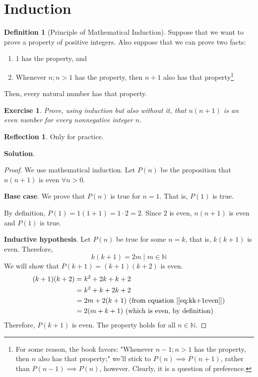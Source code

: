 \documentclass[11pt]{book}
\theoremstyle{definition}
\newtheorem{definition}{Definition}
\theoremstyle{plain}
\newtheorem{exercise}{Exercise}
\theoremstyle{definition}
\theoremstyle{problemstyle}
\theoremstyle{remark}
\theoremstyle{definition}
\newtheorem{reflection}{Reflection}
\begin{document}
\section{Induction}
\begin{definition}[Principle of Mathematical Induction]
    Suppose that we want to prove a property of positive integers. Also suppose that we can prove two facts:
    \begin{enumerate}[label=\alph*)]
        \item $1$ has the property, and
        \item Whenever $n; n>1$ has the property, then $n+1$ also has that property\footnote{For some reason, the book favors: "Whenever $n-1; n>1$ has the property, then $n$ also has that property;" we'll stick to $P(n)\implies P(n+1)$, rather than $P(n-1)\implies P(n)$, however. Clearly, it is a question of preference.}
    \end{enumerate}
    Then, every natural number has that property.
\end{definition}
\begin{exercise}
    \label{ex:2.1.1}
    Prove, using induction but also without it, that $n(n+1)$ is an even number for every nonnegative integer $n$.
\end{exercise}
\begin{reflection}
    Only for practice.
\end{reflection}
\textbf{Solution}.
\begin{proof}
    We use mathematical induction. Let $P(n)$ be the proposition that $n(n+1)$ is even $\forall n>0$.

    \textbf{Base case}. We prove that $P(n)$ is true for $n=1$. That is, $P(1)$ is true.

    By definition, $P(1)=1(1+1)=1\cdot 2=2$. Since $2$ is even, $n(n+1)$ is even and $P(1)$ is true.

    \textbf{Inductive hypothesis}. Let $P(n)$ be true for some $n=k$, that is, $k(k+1)$ is even. Therefore,
    \begin{equation}
        \label{eq:kk+1even}
        k(k+1)=2m\mid m\in\mathbb{N}
    \end{equation}
    We will show that $P(k+1)=(k+1)(k+2)$ is even.
    \begin{align*}
        (k+1)(k+2)&=k^2+2k+k+2\\
        &=k^2+k+2k+2\\
        &=2m+2(k+1)\text{ (from equation [\ref{eq:kk+1even}])}\\
        &=2(m+k+1)\text{ (which is even, by definition)}
    \end{align*}
    Therefore, $P(k+1)$ is even. The property holds for all $n\in\mathbb{N}$.
\end{proof}
\end{document}
